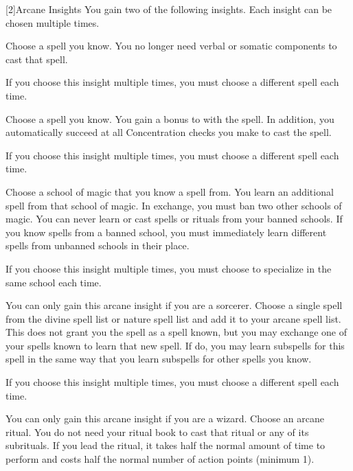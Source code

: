         [2]{Arcane Insights} 
        You gain two of the following insights.
        Each insight can be chosen multiple times.

        {
             Choose a spell you know.
            You no longer need verbal or somatic components to cast that spell.
            \par If you choose this insight multiple times, you must choose a different spell each time.

             Choose a spell you know.
            You gain a  bonus to  with the spell.
            In addition, you automatically succeed at all Concentration checks you make to cast the spell.
            \par If you choose this insight multiple times, you must choose a different spell each time.

             Choose a school of magic that you know a spell from.
            You learn an additional spell from that school of magic.
            In exchange, you must ban two other schools of magic.
            You can never learn or cast spells or rituals from your banned schools.
            If you know spells from a banned school, you must immediately learn different spells from unbanned schools in their place.
            \par If you choose this insight multiple times, you must choose to specialize in the same school each time.

             You can only gain this arcane insight if you are a sorcerer.
            Choose a single spell from the divine spell list or nature spell list and add it to your arcane spell list.
            This does not grant you the spell as a spell known, but you may exchange one of your spells known to learn that new spell.
            If do, you may learn subspells for this spell in the same way that you learn subspells for other spells you know.
            \par If you choose this insight multiple times, you must choose a different spell each time.

             You can only gain this arcane insight if you are a wizard.
            Choose an arcane ritual.
            You do not need your ritual book to cast that ritual or any of its subrituals.
            If you lead the ritual, it takes half the normal amount of time to perform and costs half the normal number of action points (minimum 1).
        }

